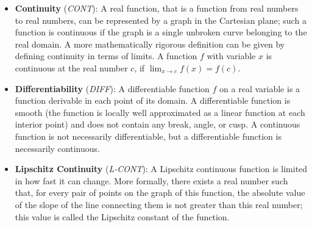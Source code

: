 \documentclass[sn-mathphys-num]{sn-jnl}%
\newcommand{\tod}[1]{{\color{magenta}\textbf{***{#1}***}}}
\newcommand \cont{\textit{CONT}}
\newcommand \lcont{\textit{L-CONT}}
\newcommand \diff{\textit{DIFF}}
\begin{document}
 \begin{itemize}
    \item \textbf{Continuity} (\cont): A real function, that is a function from real numbers to real numbers, can be represented by a graph in the Cartesian plane; such a function is continuous if the graph is a single unbroken curve belonging to the real domain. A more mathematically rigorous definition can be given by defining continuity in terms of limits. A function $f$ with variable $x$ is continuous at the real number $c$, if $\lim_{x \to c} f(x) = f(c)$.
    \item \textbf{Differentiability} (\diff): A differentiable function $f$ on a real variable is a function derivable in each point of its domain. A differentiable function is smooth (the function is locally well approximated as a linear function at each interior point) and does not contain any break, angle, or cusp. A continuous function is not necessarily differentiable, but a differentiable function is necessarily continuous.
    \item \textbf{Lipschitz Continuity} (\lcont): A Lipschitz continuous function is limited in how fast it can change. More formally, there exists a real number such that, for every pair of points on the graph of this function, the absolute value of the slope of the line connecting them is not greater than this real number; this value is called the Lipschitz constant of the function. %
    

\end{itemize}
\end{document}
